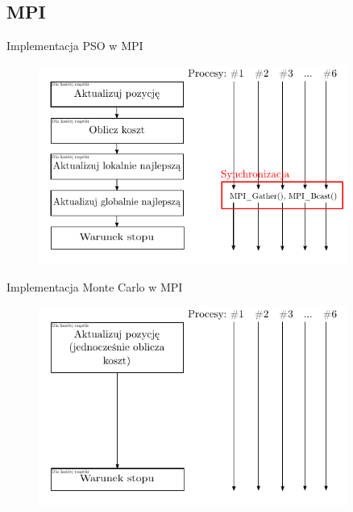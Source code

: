 \documentclass[handout]{beamer}
\begin{document}
\subsection{MPI}

\begin{frame}{Implementacja PSO w MPI}
\begin{figure}[t]
\includegraphics[width=0.9\textwidth]{grafiki/alg_MPI_PSO.pdf}
\end{figure}
\end{frame}

\begin{frame}{Implementacja Monte Carlo w MPI}
\begin{figure}[t]
\includegraphics[width=0.9\textwidth]{grafiki/alg_MPI_MC.pdf}
\end{figure}
\end{frame}
\end{document}
